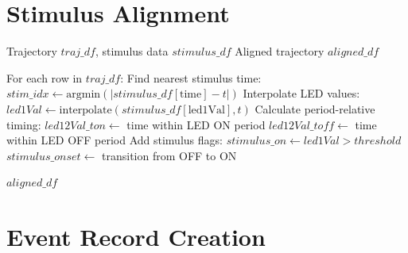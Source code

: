 \documentclass[
  11pt,
]{article}
\begin{document}
\hypertarget{stimulus-alignment}{%
\section{Stimulus Alignment}\label{stimulus-alignment}}

\begin{algorithm}[H]
\caption{Align Trajectory with Stimulus}
\label{alg:align-stimulus}
\begin{algorithmic}[1]
\REQUIRE Trajectory $traj\_df$, stimulus data $stimulus\_df$
\ENSURE Aligned trajectory $aligned\_df$

\STATE For each row in $traj\_df$:
    \STATE Find nearest stimulus time: $stim\_idx \leftarrow \text{argmin}(|stimulus\_df[\text{time}] - t|)$
    \STATE Interpolate LED values: $led1Val \leftarrow \text{interpolate}(stimulus\_df[\text{led1Val}], t)$
    \STATE Calculate period-relative timing:
    \STATE \quad $led12Val\_ton \leftarrow$ time within LED ON period
    \STATE \quad $led12Val\_toff \leftarrow$ time within LED OFF period
    \STATE Add stimulus flags:
    \STATE \quad $stimulus\_on \leftarrow led1Val > threshold$
    \STATE \quad $stimulus\_onset \leftarrow$ transition from OFF to ON
\ENDFOR

\RETURN $aligned\_df$
\end{algorithmic}
\end{algorithm}

\hypertarget{event-record-creation}{%
\section{Event Record Creation}\label{event-record-creation}}
\end{document}
